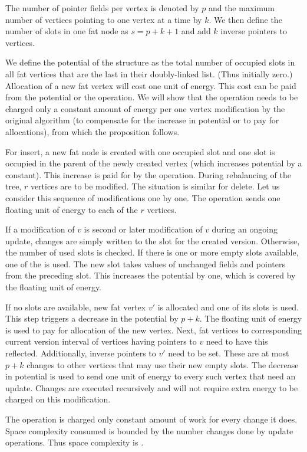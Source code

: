 \begin{myproof}
The number of pointer fields per vertex is denoted by $p$ and the maximum number of vertices pointing to one vertex at a time by $k$. 
We then define the number of slots in one fat node as $s = p + k + 1$ and add $k$ inverse pointers to vertices.

We define the potential of the structure as the total number of occupied slots in all fat vertices that are the last in their doubly-linked list. 
(Thus initially zero.) 
Allocation of a new fat vertex will cost one unit of energy. 
This cost can be paid from the potential or the operation. 
We will show that the operation needs to be charged only a constant amount of energy per one vertex modification by the original algorithm (to compensate for the increase in potential or to pay for allocations), from which the proposition follows.

For insert, a new fat node is created with one occupied slot and one slot is occupied in the parent of the newly created vertex (which increases potential by a constant). 
This increase is paid for by the operation. During rebalancing of the tree, $r$ vertices are to be modified. 
The situation is similar for delete.
Let us consider this sequence of modifications one by one. 
The operation sends one floating unit of energy to each of the $r$ vertices.

If a modification of $v$ is second or later modification of $v$ during an ongoing update, changes are simply written to the slot for the created version. 
Otherwise, the number of used slots is checked. 
If there is one or more empty slots available, one of the is used. 
The new slot takes values of unchanged fields and pointers from the preceding slot. 
This increases the potential by one, which is covered by the floating unit of energy.

If no slots are available, new fat vertex $v'$ is allocated and one of its slots is used. 
This step triggers a decrease in the potential by $p+k$. 
The floating unit of energy is used to pay for allocation of the new vertex. 
Next, fat vertices to corresponding current version interval of vertices having pointers to $v$ need to have this reflected. 
Additionally, inverse pointers to $v'$ need to be set. 
These are at most $p+k$ changes to other vertices that may use their new empty slots. 
The decrease in potential is used to send one unit of energy to every such vertex that need an update. 
Changes are executed recursively and will not require extra energy to be charged on this modification.

The operation is charged only constant amount of work for every change it does.
Space complexity consumed is bounded by the number changes done by update operations. Thus space complexity is . 
\end{myproof}

